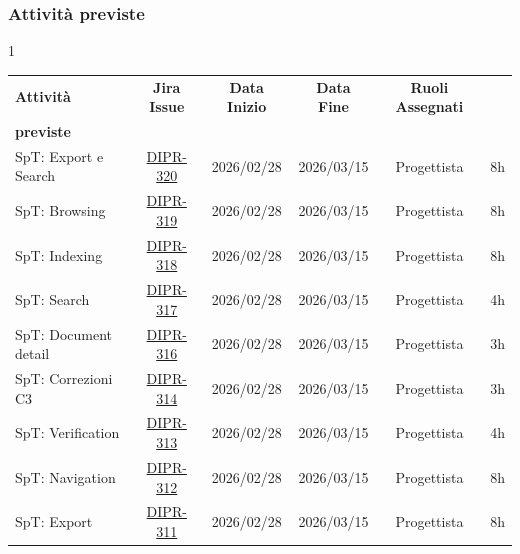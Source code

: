 \documentclass[a4paper,12pt]{article}
\begin{document}
\setlength{\LTleft}{-0,4cm}
\subsubsection{Attività previste}
\begin{spacing}{1}
    \small
\begin{longtable}{|p{4cm}|c|c|c|c|c|}
        \hline
        \rowcolor{zpusgreen!30}
        \textbf{Attività} & \textbf{Jira Issue} & \textbf{Data Inizio} & \textbf{Data Fine} & \textbf{Ruoli Assegnati} & \begin{tabular}[c]{@{}c@{}} \textbf{Ore} \\ \textbf{previste} \end{tabular} \\
        \hline
        [BACKEND] SpT: Export e Search & \href{https://7zpus.atlassian.net/browse/DIPR-320}{DIPR-320} & 2026/02/28 & 2026/03/15 & Progettista & 8h \\
        \hline
        [BACKEND] SpT: Browsing & \href{https://7zpus.atlassian.net/browse/DIPR-319}{DIPR-319} & 2026/02/28 & 2026/03/15 & Progettista & 8h \\
        \hline
        [BACKEND] SpT: Indexing & \href{https://7zpus.atlassian.net/browse/DIPR-318}{DIPR-318} & 2026/02/28 & 2026/03/15 & Progettista & 8h \\
        \hline
        [FRONTEND] SpT: Search & \href{https://7zpus.atlassian.net/browse/DIPR-317}{DIPR-317} & 2026/02/28 & 2026/03/15 & Progettista & 4h \\
        \hline
        [FRONTEND] SpT: Document detail & \href{https://7zpus.atlassian.net/browse/DIPR-316}{DIPR-316} & 2026/02/28 & 2026/03/15 & Progettista & 3h \\
        \hline
        [FRONTEND] SpT: Correzioni C3 & \href{https://7zpus.atlassian.net/browse/DIPR-314}{DIPR-314} & 2026/02/28 & 2026/03/15 & Progettista & 3h \\
        \hline
        [FRONTEND] SpT: Verification & \href{https://7zpus.atlassian.net/browse/DIPR-313}{DIPR-313} & 2026/02/28 & 2026/03/15 & Progettista & 4h \\
        \hline
        [FRONTEND] SpT: Navigation & \href{https://7zpus.atlassian.net/browse/DIPR-312}{DIPR-312} & 2026/02/28 & 2026/03/15 & Progettista & 8h \\
        \hline
        [FRONTEND] SpT: Export & \href{https://7zpus.atlassian.net/browse/DIPR-311}{DIPR-311} & 2026/02/28 & 2026/03/15 & Progettista & 8h \\

\end{longtable}
\end{spacing}
\end{document}
